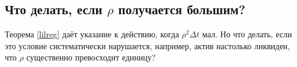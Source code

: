 \begin{appendices}
        \section{Что делать, если $\rho$ получается большим?} \label{AppendixBigRho}

        Теорема \ref{lilreg} даёт указание к действию, когда $\rho^2 \Delta t$ мал. Но что делать, если это условие систематически 
        нарушается, например, актив настолько ликвиден, что $\rho$ существенно превосходит единицу? \par
        

\end{appendices}
